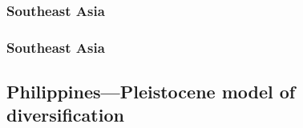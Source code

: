 {
\begin{frame}
    \frametitle{Southeast Asia}    
\end{frame}
}

{
\begin{frame}
    \frametitle{Southeast Asia}    
\end{frame}
}

\subsection{Philippines---Pleistocene model of diversification}

